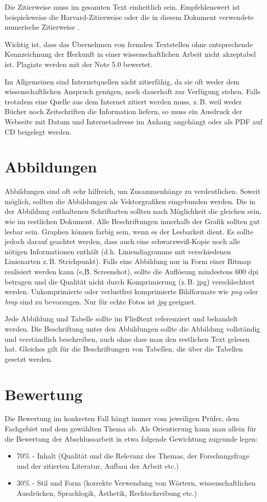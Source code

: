 \documentclass[conference,final,a4paper]{IEEEtran}
\begin{document}
Die Zitierweise muss im gesamten Text einheitlich sein. Empfehlenswert ist beispielsweise die Harvard-Zitierweise oder die in diesem Dokument verwendete numerische Zitierweise \cite{kornmeier}.

Wichtig ist, dass das Übernehmen von fremden Textstellen ohne entsprechende Kennzeichnung der Herkunft in einer wissenschaftlichen Arbeit nicht akzeptabel ist. Plagiate werden mit der Note 5.0 bewertet.

Im Allgemeinen sind Internetquellen nicht zitierfähig, da sie oft weder dem wissenschaftlichen Anspruch genügen, noch dauerhaft zur Verfügung stehen. Falls trotzdem eine Quelle aus dem Internet zitiert werden muss, z.\,B. weil weder Bücher noch Zeitschriften die Information liefern, so muss ein Ausdruck der Webseite mit Datum und Internetadresse im Anhang angehängt oder als PDF auf CD beigelegt werden.

\section{Abbildungen}
Abbildungen sind oft sehr hilfreich, um Zusammenhänge zu verdeutlichen. Soweit möglich, sollten die Abbildungen als Vektorgrafiken eingebunden werden. Die in der Abbildung enthaltenen Schriftarten sollten nach Möglichkeit die gleichen sein, wie im restlichen Dokument. Alle Beschriftungen innerhalb der Grafik sollten gut lesbar sein.
Graphen können farbig sein, wenn es der Lesbarkeit dient. Es sollte jedoch darauf geachtet werden, dass auch eine schwarz\-weiß-Kopie noch alle nötigen Informationen enthält (d.h. Liniendiagramme mit verschiedenen Linienarten z.\,B. Strichpunkt).  
Falls eine Abbildung nur in Form einer Bitmap realisiert werden kann (e,\.B. Screenshot), sollte die Auflösung mindestens 600 dpi betragen und die Qualität nicht durch Komprimierung (z.\,B. jpg) verschlechtert werden. Unkomprimierte oder verlustfrei komprimierte Bildformate wie \emph{png} oder \emph{bmp} sind zu bevorzugen. Nur für echte Fotos ist \emph{jpg} geeignet.

Jede Abbildung und Tabelle sollte im Fließtext referenziert und behandelt werden. Die Beschriftung unter den Abbildungen sollte die Abbildung vollständig und verständlich beschreiben, auch ohne dass man den restlichen Text gelesen hat. Gleiches gilt für die Beschriftungen von Tabellen, die über die Tabellen gesetzt werden.

\section{Bewertung}
Die Bewertung im konkreten Fall hängt immer vom jeweiligen Prüfer, dem Fachgebiet und dem gewählten Thema ab. Als Orientierung kann man allein für die Bewertung der Abschlussarbeit in etwa folgende Gewichtung zugrunde legen:
\begin{itemize}
\item 70\% - Inhalt (Qualität und die Relevanz des Themas, der Forschungsfrage und der zitierten Literatur, Aufbau der Arbeit  etc.)
\item 30\% - Stil und Form (korrekte Verwendung von Wörtern, wissenschaftlichen Ausdrücken, Sprachlogik, Ästhetik, Rechtschreibung etc.)
\end{itemize}
\end{document}

